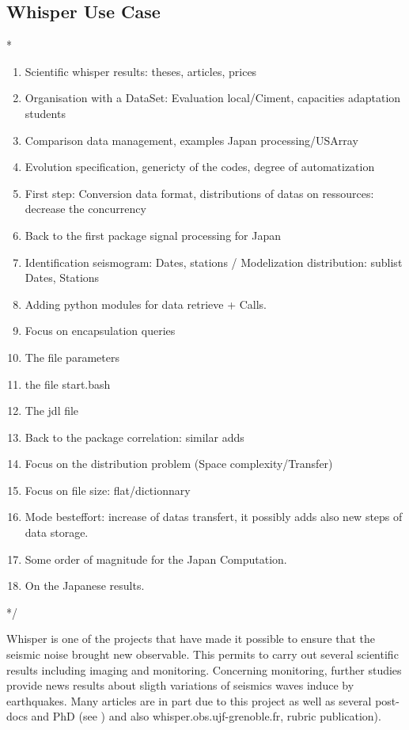 \documentclass[a4paper, 10pt]{article}
\begin{document}
\begin{multicols}{2}
\subsection{Whisper Use Case}
\/*
	\begin{enumerate}
	  \item Scientific whisper results: theses, articles, prices
  	  \item Organisation with a DataSet: Evaluation local/Ciment, capacities adaptation students
  	  \item Comparison data management, examples Japan processing/USArray 
  	  \item Evolution specification, genericty of the codes, degree of automatization
  	  \item First step: Conversion data format, distributions of datas on ressources: decrease the concurrency
  	  \item Back to the first package signal processing for Japan
  	  \item Identification seismogram: Dates, stations  / Modelization distribution: sublist Dates, Stations
  	  \item Adding python modules for data retrieve + Calls.
  	  \item Focus on encapsulation queries
      \item The file parameters
      \item the file start.bash
      \item The jdl file
  	  \item Back to the package correlation: similar adds 
  	  \item Focus on the distribution problem (Space complexity/Transfer)
  	  \item Focus on file size: flat/dictionnary
  	  \item Mode besteffort: increase of datas transfert, it possibly adds also new steps of data storage.
  	  \item Some order of magnitude for the Japan Computation.
  	  \item On the Japanese results.
  	\end{enumerate}
*/

Whisper is one of the projects that have made it possible to ensure that the seismic noise brought new observable.
This permits to carry out several scientific results including imaging and monitoring. 
Concerning monitoring, further studies provide news results about sligth variations of seismics waves induce by earthquakes.
Many articles are in part due to this project as well as
several post-docs and PhD (see \cite{key:CFLC2010, key:BPCPBR, key:HCM2014, key:OPLC2013, key:PCP, key:MPPVCS}) and also whisper.obs.ujf-grenoble.fr, rubric publication).



\end{multicols}
\end{document}
